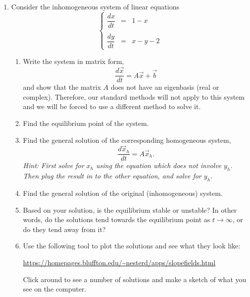 \documentclass[10pt,psamsfonts,reqno,oneside,letterpaper]{amsart}
\begin{document}
\begin{enumerate}[I]
	\item Consider the inhomogeneous system of linear equations
	\[ \left \{ \begin{array}{rcl} \dfrac{dx}{dt} &=& 1 - x \\ \\
		\dfrac{dy}{dt} &=& x - y - 2\end{array} \right. \]
	\begin{enumerate}
		\item Write the system in matrix form, 
		\[ \frac{d \vec{x}}{dt} = A \vec{x} + \vec{b} \]
		and show that the matrix $A$ does not have an eigenbasis (real or complex).  Therefore, our standard methods will not apply to this system and we will be forced to use a different method to solve it.
		\item Find the equilibrium point of the system.
		\item Find the general solution of the corresponding homogeneous system, 
		\[ \frac{d \vec{x}_h}{dt} = A \vec{x}_h. \]
		\textit{Hint: First solve for $x_h$ using the equation which does not involve $y_h$.  Then plug the result in to the other equation, and solve for $y_h$.} 
		\item Find the general solution of the original (inhomogeneous) system.
		\item Based on your solution, is the equilibrium stable or unstable?  In other words, do the solutions tend towards the equilibrium point as $t \to \infty$, or do they tend away from it?
		\item Use the following tool to plot the solutions and see what they look like:
		\begin{center} \url{https://homepages.bluffton.edu/~nesterd/apps/slopefields.html} \end{center}
		Click around to see a number of solutions and make a sketch of what you see on the computer. 
	\end{enumerate}
	

\end{enumerate}
\end{document}
